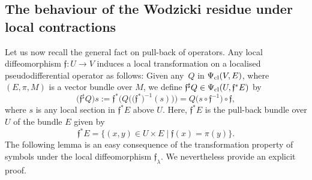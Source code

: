\documentclass[10pt,a4paper]{amsart}
\numberwithin{equation}{section}
\theoremstyle{definition}
\begin{document}
\subsection{The behaviour of the Wodzicki residue under local contractions}
Let us now recall the general fact on pull-back of operators. Any local diffeomorphism $\mathfrak{f}\colon U\to V$ induces a local transformation on a localised pseudodifferential {operator} as follows: Given any~$Q$ in $\Psi_{\rm cl}(V,E)$, where $(E,\pi,M)$ is a vector bundle over $M$, we define $\mathfrak{f}^\sharp Q\in \Psi_{\rm cl}(U,\mathfrak{f}^*E)$ by
\begin{equation}\label{eq:flambda}
 \bigl(\mathfrak{f}^\sharp Q\bigr) s:= \mathfrak{f}^* \bigl( Q\bigl(\bigl( \mathfrak{f}^*\bigr)^{-1}(s)\bigr)\bigr)= Q\bigl(s\circ \mathfrak{f}^{-1} \bigr)\circ \mathfrak{f},
 \end{equation}
where $s$ is any local section in $\mathfrak{f}^*E$ above $U$. Here, $\mathfrak{f}^*E$ is the pull-back bundle over $U$ of the bundle $E$ given by
\[\mathfrak{f}^*E=\{(x,y)\in U\times E \mid \mathfrak{f}(x)=\pi(y)\}.\]
The following lemma is an easy consequence of the transformation property of symbols under the local diffeomorphism ${\mathfrak f}_{ \lambda}$. We nevertheless provide an explicit proof.
\end{document}
